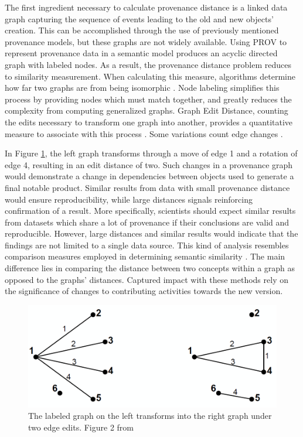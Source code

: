 The first ingredient necessary to calculate provenance distance is a linked data graph capturing the sequence of events leading to the old and new objects' creation.
This can be accomplished through the use of previously mentioned provenance models, but these graphs are not widely available.
Using PROV to represent provenance data in a semantic model produces an acyclic directed graph with labeled nodes.
As a result, the provenance distance problem reduces to similarity measurement.
When calculating this measure, algorithms determine how far two graphs are from being isomorphic \cite{Cao2013}.
Node labeling simplifies this process by providing nodes which must match together, and greatly reduces the complexity from computing generalized graphs.
Graph Edit Distance, counting the edits necessary to transform one graph into another, provides a quantitative measure to associate with this process  \cite{Gao2010}.
Some variations count edge changes \cite{Goddard:1996:DGU:246962.246972}.

In Figure \ref{GraphEdit}, the left graph transforms through a move of edge 1 and a rotation of edge 4, resulting in an edit distance of two.
Such changes in a provenance graph would demonstrate a change in dependencies between objects used to generate a final notable product.
Similar results from data with small provenance distance would ensure reproducibility, while large distances signals reinforcing confirmation of a result.
More specifically, scientists should expect similar results from datasets which share a lot of provenance if their conclusions are valid and reproducible.
However, large distances and similar results would indicate that the findings are not limited to a single data source.
This kind of analysis resembles comparison measures employed in determining semantic similarity \cite{Hliaoutakis06informationretrieval}.
The main difference lies in comparing the distance between two concepts within a graph as opposed to the graphs' distances.
Captured impact with these methods rely on the significance of changes to contributing activities towards the new version.

\begin{figure}
	\centering
	\includegraphics[scale=0.40]{figures/GraphEdit.png}
	\caption[The labeled graph on the left transforms into the right graph under two edge edits.]{The labeled graph on the left transforms into the right graph under two edge edits. Figure 2 from \cite{Goddard:1996:DGU:246962.246972}}
	\label{GraphEdit}
\end{figure}

